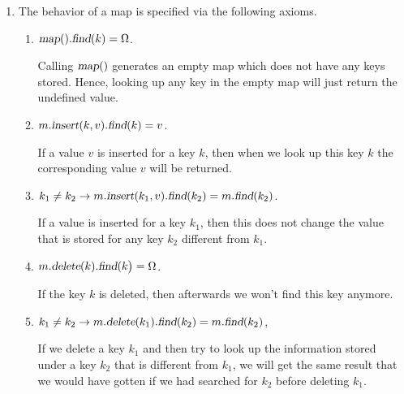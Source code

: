 \begin{Definition}[Map]
{\begin{enumerate}
\begin{enumerate}
              The function call returns the resulting map.
        \item $\textsl{delete}: \textsl{Map} \times \textsl{Key} \rightarrow \textsl{Map}$

              The function call
              \\[0.2cm]
              \hspace*{1.3cm}
              $m.\textsl{delete}(k)$ 
              \\[0.2cm]
              removes the key $k$ and any value associated with $k$ from the map $m$.  If the map $m$ does not contain a value for the
              key $k$, then the map is returned unchanged.

              The function call returns the new map. 
        \end{enumerate}
  \item The behavior of a map is specified via the following axioms.
        \begin{enumerate}
        \item $\textsl{map}().\textsl{find}(k) = \Omega$.

              Calling $\textsl{map}()$ generates an empty map which does not have any keys stored.
              Hence, looking up any key in the empty map will just return the undefined value.
        \item $m.\textsl{insert}(k, v).\textsl{find}(k) = v$.

              If a value $v$ is inserted for a key $k$, then when we look up this key $k$ the corresponding value
              $v$ will be returned.
        \item $k_1 \not= k_2 \rightarrow m.\textsl{insert}(k_1, v).\textsl{find}(k_2) = m.\textsl{find}(k_2)$.

              If a value is inserted for a key $k_1$, then this does not change the value that is stored
              for any key $k_2$  different from $k_1$.
        \item $m.\textsl{delete}(k).\textsl{find}(k\bigr) = \Omega$.

              If the key $k$ is deleted, then afterwards we won't find this key anymore.
        \item $k_1 \not= k_2 \rightarrow 
               m.\textsl{delete}(k_1).\textsl{find}(k_2) = m.\textsl{find}(k_2)$,

              If  we delete a key $k_1$ and then try to look up the information stored under a key
              $k_2$ that is different from $k_1$, we will get the same result that we would have gotten
              if we had searched for $k_2$ before deleting $k_1$.
              \eox
        \end{enumerate}
  \end{enumerate}
}
\end{Definition}

